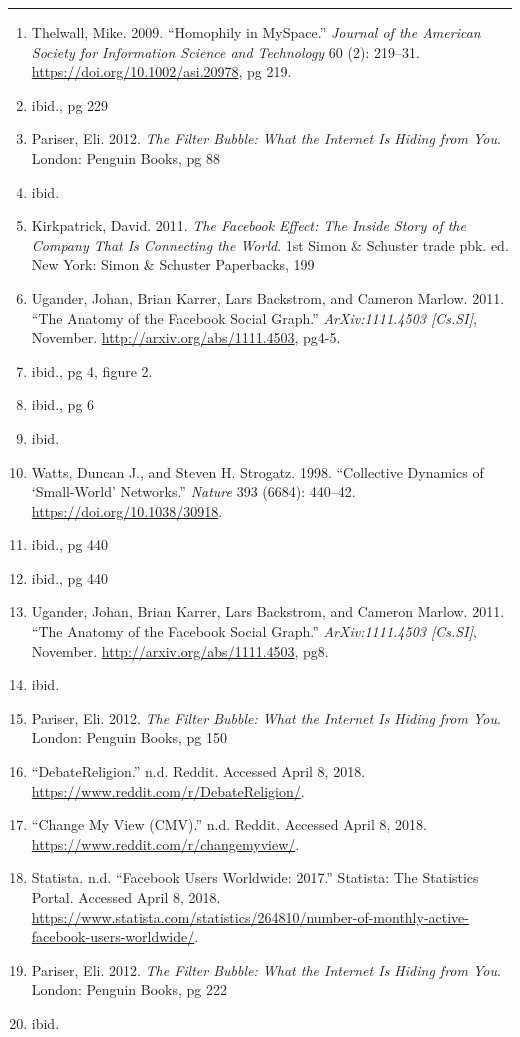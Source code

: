 \documentclass[]{article}
\providecommand{\tightlist}{%
  \setlength{\itemsep}{0pt}\setlength{\parskip}{0pt}}
\begin{document}
\begin{center}\rule{0.5\linewidth}{\linethickness}\end{center}

\begin{enumerate}
\def\labelenumi{\arabic{enumi}.}
\setcounter{enumi}{20}
\tightlist
\item
  Thelwall, Mike. 2009. ``Homophily in MySpace.'' \emph{Journal of the
  American Society for Information Science and Technology} 60 (2):
  219--31. \url{https://doi.org/10.1002/asi.20978}, pg 219.
\item
  ibid., pg 229
\item
  Pariser, Eli. 2012. \emph{The Filter Bubble: What the Internet Is
  Hiding from You}. London: Penguin Books, pg 88
\item
  ibid.
\item
  Kirkpatrick, David. 2011. \emph{The Facebook Effect: The Inside Story
  of the Company That Is Connecting the World}. 1st Simon \& Schuster
  trade pbk. ed. New York: Simon \& Schuster Paperbacks, 199
\item
  Ugander, Johan, Brian Karrer, Lars Backstrom, and Cameron Marlow.
  2011. ``The Anatomy of the Facebook Social Graph.''
  \emph{ArXiv:1111.4503 {[}Cs.SI{]}}, November.
  \url{http://arxiv.org/abs/1111.4503}, pg4-5.
\item
  ibid., pg 4, figure 2.
\item
  ibid., pg 6
\item
  ibid.
\item
  Watts, Duncan J., and Steven H. Strogatz. 1998. ``Collective Dynamics
  of `Small-World' Networks.'' \emph{Nature} 393 (6684): 440--42.
  \url{https://doi.org/10.1038/30918}.
\item
  ibid., pg 440
\item
  ibid., pg 440
\item
  Ugander, Johan, Brian Karrer, Lars Backstrom, and Cameron Marlow.
  2011. ``The Anatomy of the Facebook Social Graph.''
  \emph{ArXiv:1111.4503 {[}Cs.SI{]}}, November.
  \url{http://arxiv.org/abs/1111.4503}, pg8.
\item
  ibid.
\item
  Pariser, Eli. 2012. \emph{The Filter Bubble: What the Internet Is
  Hiding from You}. London: Penguin Books, pg 150
\item
  ``DebateReligion.'' n.d. Reddit. Accessed April 8, 2018.
  \url{https://www.reddit.com/r/DebateReligion/}.
\item
  ``Change My View (CMV).'' n.d. Reddit. Accessed April 8, 2018.
  \url{https://www.reddit.com/r/changemyview/}.
\item
  Statista. n.d. ``Facebook Users Worldwide: 2017.'' Statista: The
  Statistics Portal. Accessed April 8, 2018.
  \url{https://www.statista.com/statistics/264810/number-of-monthly-active-facebook-users-worldwide/}.
\item
  Pariser, Eli. 2012. \emph{The Filter Bubble: What the Internet Is
  Hiding from You}. London: Penguin Books, pg 222
\item
  ibid.
\end{enumerate}
\end{document}

